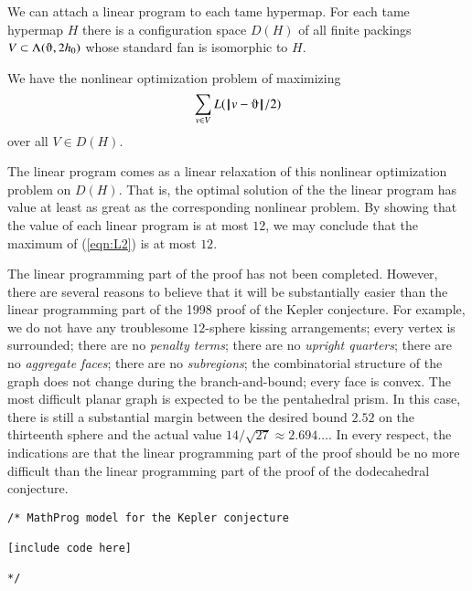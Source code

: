We can attach a linear program to each tame hypermap.
For each tame hypermap $H$ there is a configuration space $D(H)$ of all
finite packings $V\subset \Lambda(\orgn,2\hm)$ whose standard fan is
isomorphic to $H$.

We have the nonlinear optimization problem of maximizing
\begin{equation}\label{eqn:L2}
\sum_{v\in V} L(\norm{v}{\orgn}/2)
\end{equation}
over all $V\in D(H)$.

The linear program comes as a linear relaxation of this nonlinear
optimization problem on $D(H)$. That is, the optimal solution of the
the linear program has value at least as great as the corresponding
nonlinear problem.  By showing that the value of each linear program
is at most $12$, we may conclude that the maximum of (\ref{eqn:L2})
is at most $12$.


\begin{note}%
The linear programming part of the proof has not been completed.  However, there are several reasons to believe that it will be substantially easier than the linear programming part of the 1998 proof of the Kepler conjecture.  For example, we do not have any troublesome $12$-sphere kissing arrangements; every vertex is surrounded; there are no {\it penalty terms}; there are no {\it upright quarters}; there are no {\it aggregate faces}; there are no {\it subregions}; the combinatorial structure of the graph does not change during the branch-and-bound; every face is convex.  The most difficult planar graph is expected to be the pentahedral prism.  In this case, there is still a substantial margin between the desired bound $2.52$ on the thirteenth sphere and the actual value $14/\sqrt{27}\approx 2.694\ldots$.  In every respect, the indications are that the linear programming part of the proof should be no more difficult than the linear programming part of the proof of the dodecahedral conjecture.
\end{note}

\newpage
\begin{verbatim}
/* MathProg model for the Kepler conjecture

[include code here]

*/
\end{verbatim}
